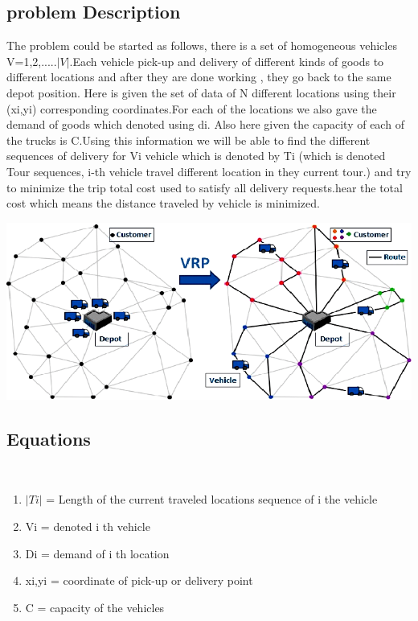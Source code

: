 \documentclass[conference]{IEEEtran}
\begin{document}
\subsection{{\textbf{problem Description}}}\label{AA}
The problem could be started as follows, there is a set of homogeneous vehicles V={1,2,.....$|V|$}.Each vehicle pick-up and delivery of different kinds of goods to different locations and after they are done working , they go back to the same depot position. Here is given the set of data of N different locations using their (xi,yi) corresponding coordinates.For each of the locations we also gave the demand of goods which denoted using di. Also here given the capacity of each of the trucks is C.Using this information we
will be able to find the different sequences of delivery for Vi vehicle which is denoted by Ti (which is denoted Tour sequences, i-th vehicle travel different location in they current tour.) and try to minimize the trip total cost used to satisfy all delivery requests.hear the total cost which means the distance traveled by vehicle is minimized.\\


\begin{center}
\includegraphics[width=1\linewidth]{
VRT.png}\par  
\end{center}

\vspace{5}

\subsection{{\textbf{Equations}}}\\
\vspace{1}
\begin{enumerate}
\item $|Ti|$ = Length of the current traveled locations sequence of i the vehicle \\ 
\item Vi = denoted i th vehicle \\ 
\item Di = demand of i th location \\
\item xi,yi = coordinate of pick-up or delivery point \\
\item C = capacity of the vehicles \\
\end{enumerate}
\end{document}
